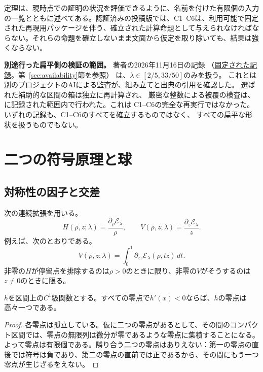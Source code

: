 定理は、現時点での証明の状況を評価できるように、名前を付けた有限個の入力の一覧とともに述べてある。認証済みの投稿版では、C1--C6は、利用可能で固定された再現用パッケージを伴う、確立された計算命題として与えられなければならない。それらの命題を確立しないまま文面から仮定を取り除いても、結果は強くならない。

\noindent\textbf{別途行った扁平側の検証の範囲。}
著者の2026年11月16日の記録
（\href{https://github.com/cotaxxxx/bg-spheroid-family/blob/127be52046e9498d1306fe3d35c3e02e91c636de/runs/2026-11-16/D_OB_GLOBAL_CLOSED_V24/JUDGE_RULING_D_OB_GLOBAL_CLOSED_20261116.md}{固定された記録}。第~\ref{sec:availability}節を参照）
は、$\lambda\in[2/5,33/50]$のみを扱う。
これとは別のプロジェクトのAIによる監査が、組み立てと出典の引用を確認した。
選ばれた補助的な区間の箱は独立に再計算され、
厳密な整数による被覆の検査は、
に記録された範囲内で行われた。これは
C1--C6の完全な再実行ではなかった。いずれの記録も、C1--C6のすべてを確立するものではなく、
すべての扁平な形状を扱うものでもない。

\section{二つの符号原理と球}\label{sec:principles}

\subsection{対称性の因子と交差}
次の連続拡張を用いる。
\begin{equation}\label{eq:HV}
 H(\rho,z;\lambda)=\frac{\partial_\rho\mathcal E_\lambda}{\rho},\qquad
 V(\rho,z;\lambda)=\frac{\partial_z\mathcal E_\lambda}{z}.
\end{equation}
例えば、次のとおりである。
\[
 V(\rho,z;\lambda)=\int_0^1\partial_{zz}\mathcal E_\lambda(\rho,tz)\,dt.
\]
非零の$H$が停留点を排除するのは$\rho>0$のときに限り、非零の$V$がそうするのは$z\ne0$のときに限る。

\begin{lemma}[一方向の交差]\label{lem:crossing}
$h$を区間上の$C^1$級関数とする。すべての零点で$h'(x)<0$ならば、$h$の零点は高々一つである。
\end{lemma}
\begin{proof}
各零点は孤立している。仮に二つの零点があるとして、その間のコンパクト区間では、零点の無限列は微分が零であるような零点に集積することになる。よって零点は有限個である。隣り合う二つの零点はありえない：第一の零点の直後では符号は負であり、第二の零点の直前では正であるから、その間にもう一つ零点が生じざるをえない。
\end{proof}

